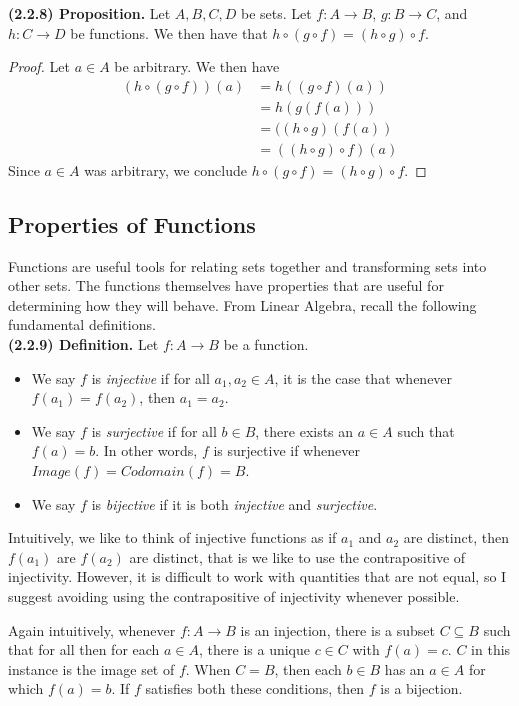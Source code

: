 \documentclass[12pt]{book}
\begin{document}
\noindent\textbf{(2.2.8) Proposition.} Let $A,B,C,D$ be sets. Let $f\colon A\rightarrow B$, $g\colon B\rightarrow C$, and $h\colon C\rightarrow D$ be functions. We then have that $h\circ(g\circ f)=(h\circ g)\circ f$.

\begin{proof}
Let $a\in A$ be arbitrary. We then have
\begin{align*}
	(h\circ(g\circ f))(a) & = h((g\circ f)(a))\\
	 & = h(g(f(a)))\\
	 & = ((h\circ g)(f(a))\\
	 & = ((h\circ g)\circ f)(a)
\end{align*}
Since $a\in A$ was arbitrary, we conclude $h\circ(g\circ f)=(h\circ g)\circ f$.
\end{proof}

\subsection*{Properties of Functions}

Functions are useful tools for relating sets together and transforming sets into other sets. The functions themselves have properties that are useful for determining how they will behave. From Linear Algebra, recall the following fundamental definitions.\\

\noindent\textbf{(2.2.9) Definition.} Let $f\colon A\rightarrow B$ be a function.
\begin{itemize}
\item We say $f$ is \textit{injective} if for all $a_1,a_2\in A$, it is the case that whenever $f(a_1)=f(a_2)$, then $a_1=a_2$. 
\item We say $f$ is \textit{surjective} if for all $b\in B$, there exists an $a\in A$ such that $f(a)=b$. In other words, $f$ is surjective if whenever $Image(f)=Codomain(f)=B$.
\item We say $f$ is \textit{bijective} if it is both \textit{injective} and \textit{surjective}.
\end{itemize}

	Intuitively, we like to think of injective functions as if $a_1$ and $a_2$ are distinct, then $f(a_1)$ are $f(a_2)$ are distinct, that is we like to use the contrapositive of injectivity. However, it is difficult to work with quantities that are not equal, so I suggest avoiding using the contrapositive of injectivity whenever possible. 

	Again intuitively, whenever $f\colon A\rightarrow B$ is an injection, there is a subset $C\subseteq B$ such that for all then for each $a\in A$, there is a unique $c\in C$ with $f(a)=c$. $C$ in this instance is the image set of $f$. When $C=B$, then each $b\in B$ has an $a\in A$ for which $f(a)=b$. If $f$ satisfies both these conditions, then $f$ is a bijection.
\end{document}

